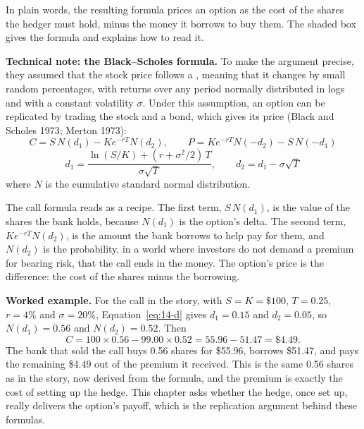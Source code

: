 In plain words, the resulting formula prices an option as the cost of the shares the hedger must hold, minus the money it borrows to buy them. The shaded box gives the formula and explains how to read it.

\begin{technote}
\textbf{Technical note: the Black--Scholes formula.} To make the argument precise, they assumed that the stock price follows a , meaning that it changes by small random percentages, with returns over any period normally distributed in logs and with a constant volatility $\sigma$. Under this assumption, an option can be replicated by trading the stock and a bond, which gives its price (Black and Scholes 1973; Merton 1973):
\begin{equation}
  C = S\,N(d_1) - K e^{-rT} N(d_2), \qquad P = K e^{-rT} N(-d_2) - S\,N(-d_1)
  \label{eq:14-bs}
\end{equation}
\begin{equation}
  d_1 = \frac{\ln(S/K) + (r + \sigma^2/2)\,T}{\sigma\sqrt{T}}, \qquad d_2 = d_1 - \sigma\sqrt{T}
  \label{eq:14-d}
\end{equation}
where $N$ is the cumulative standard normal distribution.

The call formula reads as a recipe. The first term, $S\,N(d_1)$, is the value of the shares the bank holds, because $N(d_1)$ is the option's delta. The second term, $K e^{-rT} N(d_2)$, is the amount the bank borrows to help pay for them, and $N(d_2)$ is the probability, in a world where investors do not demand a premium for bearing risk, that the call ends in the money. The option's price is the difference: the cost of the shares minus the borrowing.
\end{technote}

\textbf{Worked example.} For the call in the story, with $S = K = \$100$, $T = 0.25$, $r = 4\%$ and $\sigma = 20\%$, Equation~\eqref{eq:14-d} gives $d_1 = 0.15$ and $d_2 = 0.05$, so $N(d_1) = 0.56$ and $N(d_2) = 0.52$. Then
\begin{equation}
  C = 100 \times 0.56 - 99.00 \times 0.52 = 55.96 - 51.47 = \$4.49.
  \label{eq:14-bs-example}
\end{equation}
The bank that sold the call buys 0.56 shares for \$55.96, borrows \$51.47, and pays the remaining \$4.49 out of the premium it received. This is the same 0.56 shares as in the story, now derived from the formula, and the premium is exactly the cost of setting up the hedge. This chapter asks whether the hedge, once set up, really delivers the option's payoff, which is the replication argument behind these formulas.

